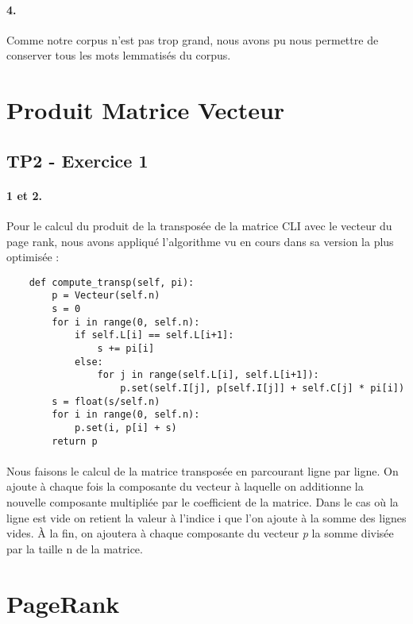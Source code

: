 \documentclass[10pt,a4paper]{article}
\begin{document}
\paragraph{4.} Comme notre corpus n'est pas trop grand, nous avons pu nous permettre de conserver tous les mots lemmatisés du corpus.




\section{Produit Matrice Vecteur}
\subsection{TP2 - Exercice 1}
\paragraph{1 et 2.} Pour le calcul du produit de la transposée de la matrice CLI avec le vecteur du page rank, nous avons appliqué l'algorithme vu en cours dans sa version la plus optimisée :
\begin{verbatim}
    def compute_transp(self, pi):
        p = Vecteur(self.n)
        s = 0
        for i in range(0, self.n):
            if self.L[i] == self.L[i+1]:
                s += pi[i]
            else:
                for j in range(self.L[i], self.L[i+1]):
                    p.set(self.I[j], p[self.I[j]] + self.C[j] * pi[i])
        s = float(s/self.n)
        for i in range(0, self.n):
            p.set(i, p[i] + s)
        return p
\end{verbatim}
\paragraph{}Nous faisons le calcul de la matrice transposée en parcourant ligne par ligne. On ajoute à chaque fois la composante du vecteur à laquelle on additionne la nouvelle composante multipliée par le coefficient de la matrice. Dans le cas où la ligne est vide on retient la valeur à l'indice i  que l'on ajoute à la somme des lignes vides. À la fin, on ajoutera à chaque composante du vecteur \textit{p} la somme divisée par la taille n de la matrice.


\section{PageRank}
\end{document}
